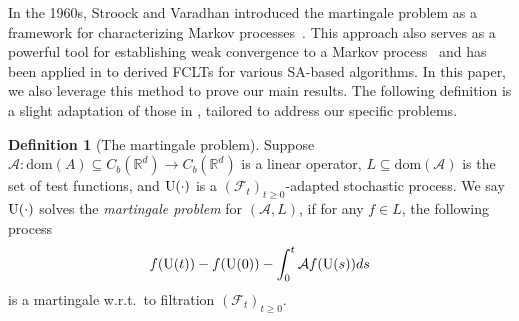 \documentclass[11pt]{article}
\theoremstyle{plain}
\theoremstyle{definition}
\newtheorem{defn}{Definition}[section]
\def\AM{{\mathcal A}}
\def\FM{{\mathcal F}}
\def\RB{{\mathbb R}}
\newcommand{\uu}{{\textnormal{U}}}
\def\dom{\mathrm{dom}}
\begin{document}
In the 1960s, Stroock and Varadhan introduced the martingale problem as a framework for characterizing Markov processes~\citep{stroock1997multidimensional}. This approach also serves as a powerful tool for establishing weak convergence to a Markov process~\citep{ethier2009markov} and has been applied in \cite{benveniste2012adaptive, gadat2018stochastic, liang2023asymptotic} to derived FCLTs for various SA-based algorithms. In this paper, we also leverage this method to prove our main results.
The following definition is a slight adaptation of those in \cite{stroock1997multidimensional, ethier2009markov}, tailored to address our specific problems.

\begin{defn}[The martingale problem]\label{def:mart_prob}
	Suppose $\AM\colon \dom(A) \subseteq C_b(\RB^d) \rightarrow C_b(\RB^d) $ is a linear operator, $L \subseteq \mathrm{dom} (\AM)$ is the set of test functions, and $\uu(\cdot)$ is a $(\FM_t)_{t \ge 0}$-adapted stochastic process. 
	We say $\uu(\cdot)$ solves the \textit{martingale problem} for $(\AM, L)$, if for any $f \in L$, the following process
	\begin{equation}\label{eq:mart-prob}
		f(\uu(t)) - f(\uu(0)) - \int_0^t \AM f(\uu(s)) ds
	\end{equation}
	 is a martingale w.r.t.\ to filtration $(\FM_t)_{t \ge 0}$.
\end{defn}

\end{document}
